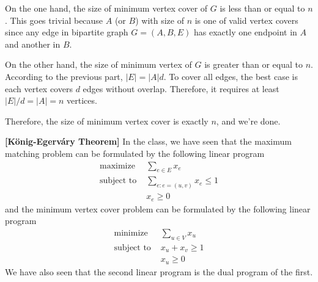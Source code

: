 \documentclass{oxmathproblems}
\begin{document}
\begin{questions}
\begin{Solution}
\begin{parts}
    On the one hand, the size of minimum vertex cover of $G$ is less than or equal to $n$. This goes trivial because $A$ (or $B$) with size of $n$ is one of valid vertex covers since any edge in bipartite graph $G=(A, B, E)$ has exactly one endpoint in $A$ and another in $B$.

    On the other hand, the size of minimum vertex of $G$ is greater than or equal to $n$. According to the previous part, $|E|=|A|d$. To cover all edges, the best case is each vertex covers $d$ edges without overlap. Therefore, it requires at least $|E|/d=|A|=n$ vertices.

    Therefore, the size of minimum vertex cover is exactly $n$, and we're done.
    
\end{parts}

\end{Solution}

\miquestion[40]\textbf{[K\"{o}nig-Egerv\'{a}ry Theorem]}
In the class, we have seen that the maximum matching problem can be formulated by the following linear program
\begin{align*}
\text{maximize }& \sum_{e\in E}x_e \\
\text{subject to }&\sum_{e:e=(u,v)}x_e\leq 1  \tag{$\forall v\in V$}\\
&x_e\geq0\tag{$\forall e\in E$}
\end{align*}
and the minimum vertex cover problem can be formulated by the following linear program
\begin{align*}
\text{minimize }& \sum_{u\in V}x_u \\
\text{subject to }&x_u+x_v\geq 1  \tag{$\forall (u,v)\in E$}\\
&x_u\geq0\tag{$\forall u\in V$}
\end{align*}
We have also seen that the second linear program is the dual program of the first.
\end{questions}
\end{document}
